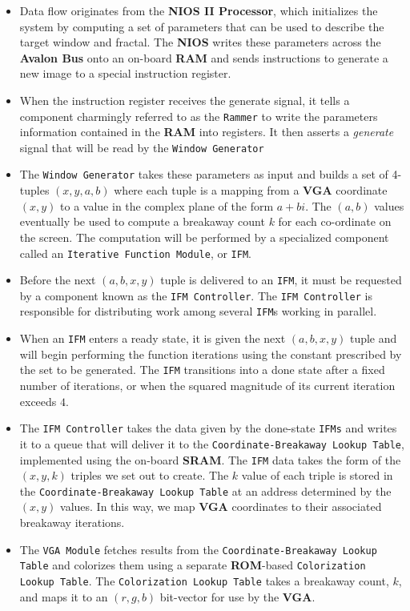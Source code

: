 \documentclass{article}
\begin{document}
\begin{itemize} 

\item Data flow originates from the \textbf{NIOS II Processor}, which initializes the system
by computing a set of parameters that can be used to describe the target window and 
fractal. The \textbf{NIOS} writes these parameters across the \textbf{Avalon Bus} onto an on-board \textbf{RAM} 
and sends instructions to generate a new image to a special instruction register.

\item When the instruction register receives the generate signal, it tells a component
charmingly referred to as the \texttt{Rammer} to write the parameters information contained 
in the \textbf{RAM} into registers. It then asserts a \textit{generate} signal that will be read by 
the \texttt{Window Generator}


\item The \texttt{Window Generator} takes these parameters as input and builds a set of 4-tuples $(x, y, a, b)$ where
  each tuple is a mapping from a \textbf{VGA} coordinate $(x, y)$ to a value in
  the complex plane of the form $a+bi$. The $(a, b)$ values eventually be used to compute a breakaway count $k$ for
  each co-ordinate on the screen. The computation will be performed by a specialized component called an 
  \texttt{Iterative Function Module}, or \texttt{IFM}.

\item Before the next $(a, b, x, y)$ tuple is delivered to an \texttt{IFM}, it must be requested by a component
known as the \texttt{IFM Controller}. The \texttt{IFM Controller} is responsible for distributing work among
several \texttt{IFM}s working in parallel. 

\item When an \texttt{IFM} enters a ready state, it is given the next $(a, b, x, y)$ tuple and will begin performing
the function iterations using the constant prescribed by the set to be generated. The \texttt{IFM} transitions into a 
done state after a fixed number of iterations, or when the squared magnitude of its current iteration exceeds $4$.

\item The \texttt{IFM Controller} takes the data given by the done-state \texttt{IFMs} and writes it to a queue
that will deliver it to the \texttt{Coordinate-Breakaway Lookup Table}, implemented using the on-board \textbf{SRAM}. 
The \texttt{IFM} data takes the form of the $(x, y, k)$ triples we set out to create. The $k$ value of each triple
is stored in the \texttt{Coordinate-Breakaway Lookup Table} at an address determined by the $(x, y)$ values. In this 
way, we map \textbf{VGA} coordinates to their associated breakaway iterations.

\item The \texttt{VGA Module} fetches results from the \texttt{Coordinate-Breakaway
  Lookup Table} and colorizes them using a separate \textbf{ROM}-based \texttt{Colorization Lookup Table}.
  The \texttt{Colorization Lookup Table} takes a breakaway count, $k$, and maps it to an $(r, g, b)$ bit-vector for use by the \textbf{VGA}.
\end{itemize}
\end{document}

